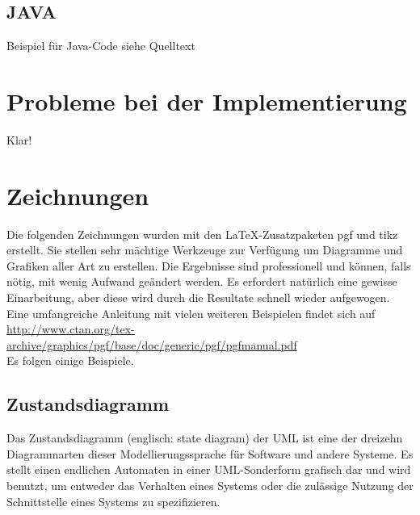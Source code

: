 


\subsection{JAVA}
Beispiel für Java-Code siehe Quelltext




\section{Probleme bei der Implementierung}
Klar!

\section{Zeichnungen}

Die folgenden Zeichnungen wurden mit den \LaTeX -Zusatzpaketen pgf und tikz erstellt. Sie stellen sehr mächtige Werkzeuge zur Verfügung um Diagramme und Grafiken aller Art zu erstellen. Die Ergebnisse sind professionell und können, falls nötig, mit wenig Aufwand geändert werden. Es erfordert natürlich eine gewisse Einarbeitung, aber diese wird durch die Resultate schnell wieder aufgewogen.
Eine umfangreiche Anleitung mit vielen weiteren Beispielen findet sich auf \\ \href{http://www.ctan.org/tex-archive/graphics/pgf/base/doc/generic/pgf/pgfmanual.pdf}{http://www.ctan.org/tex-archive/graphics/pgf/base/doc/generic/pgf/pgfmanual.pdf} \\

Es folgen einige Beispiele.


\subsection{Zustandsdiagramm}

Das Zustandsdiagramm (englisch: state diagram) der UML ist eine der dreizehn Diagrammarten dieser Modellierungssprache für Software und andere Systeme. Es stellt einen endlichen Automaten in einer UML-Sonderform grafisch dar und wird benutzt, um entweder das Verhalten eines Systems oder die zulässige Nutzung der Schnittstelle eines Systems zu spezifizieren.

